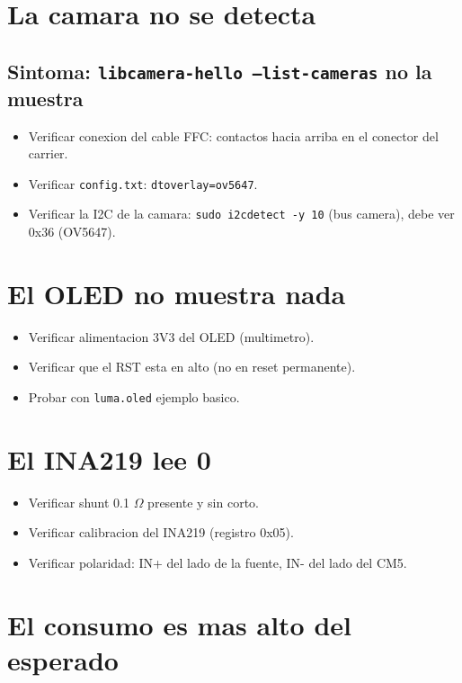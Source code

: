 \documentclass[11pt,a4paper,oneside,openright]{book}
\begin{document}
\section{La camara no se detecta}

\subsection{Sintoma: \texttt{libcamera-hello --list-cameras} no la muestra}

\begin{itemize}[leftmargin=2em]
  \item Verificar conexion del cable FFC: contactos hacia arriba en el
        conector del carrier.
  \item Verificar \texttt{config.txt}: \texttt{dtoverlay=ov5647}.
  \item Verificar la I2C de la camara:
        \texttt{sudo i2cdetect -y 10} (bus camera), debe ver 0x36 (OV5647).
\end{itemize}

\section{El OLED no muestra nada}

\begin{itemize}[leftmargin=2em]
  \item Verificar alimentacion 3V3 del OLED (multimetro).
  \item Verificar que el RST esta en alto (no en reset permanente).
  \item Probar con \texttt{luma.oled} ejemplo basico.
\end{itemize}

\section{El INA219 lee 0}

\begin{itemize}[leftmargin=2em]
  \item Verificar shunt 0.1 $\Omega$ presente y sin corto.
  \item Verificar calibracion del INA219 (registro 0x05).
  \item Verificar polaridad: IN+ del lado de la fuente, IN- del lado del CM5.
\end{itemize}

\section{El consumo es mas alto del esperado}
\end{document}
